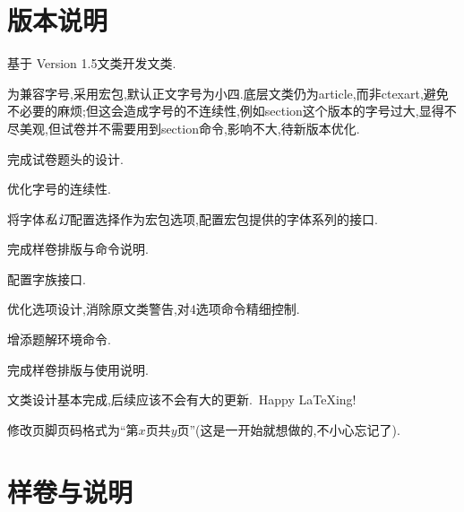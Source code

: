 \documentclass[list,answers,csize4,custom]{sysuexam}
\begin{document}
\section{版本说明}
\small{
\par
\begin{compactitem}
    \item 基于\href{https://github.com/mathedu4all/bhcexam}{} Version 1.5文类开发文类.
    \item 为兼容字号,采用\CTeX{}宏包,默认正文字号为小四.底层文类仍为article,而非ctexart,避免不必要的麻烦;但这会造成字号的不连续性,例如section这个版本的字号过大,显得不尽美观,但试卷并不需要用到section命令,影响不大,待新版本优化.
    \item 完成试卷题头的设计.
\end{compactitem}

\todo\par
\begin{compactitem}
    \item 优化字号的连续性.
    \item 将字体\textit{私订}配置选择作为宏包选项,配置\CTeX{}宏包提供的字体系列的接口.
    \item 完成样卷排版与命令说明.
\end{compactitem}

\par
\begin{compactitem}
    \item 配置字族接口.
    \item 优化选项设计,消除原文类警告,对4选项命令精细控制.
    \item 增添题解环境命令.
    \item 完成样卷排版与使用说明.
\end{compactitem}
\medskip

文类设计基本完成,后续应该不会有大的更新.~Happy \LaTeX{}ing!

\par
\begin{compactitem}
    \item 修改页脚页码格式为``第$x$页\quad 共$y$页''(这是一开始就想做的,不小心忘记了).
\end{compactitem}
}

\section{样卷与说明}
\end{document}
